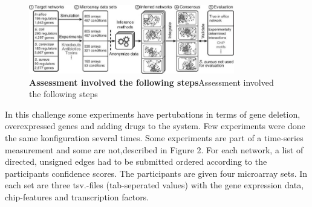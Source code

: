 

\begin{figure}
\centering
\includegraphics[width=0.8\textwidth]{./Bilder/assessment}
\caption[Interaction Graph]{\textbf{Assessment involved the following steps}Assessment involved the following steps }
\label{fig:Fig.1.}
\end{figure}

In this challenge some experiments have pertubations in terms of gene deletion, overexpressed genes and  adding drugs to the system. Few experiments were done the same konfiguration several times. Some experiments are part of a time-series measurement and some are not,described in Figure 2.
For each network, a list of directed, unsigned edges had to be submitted ordered according to the participants confidence scores. 
The participants are given four microarray sets. In each set are three  tsv.-files  (tab-seperated values) with the gene expression data, chip-features and transcription factors.\\

\noindent{}


